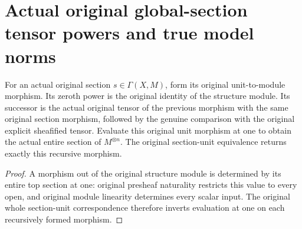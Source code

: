 \section{Actual original global-section tensor powers and true model norms}
\label{sec:scheme-global-section-tensor-power-norms}

\begin{definition}
\label{def:scheme-global-section-tensor-power}
\leanok
{}
For an actual original section $s\in\Gamma(X,M)$, form its original
unit-to-module morphism. Its zeroth power is the original identity of the
structure module. Its successor is the actual original tensor of the previous
morphism with the same original section morphism, followed by the genuine
comparison with the original explicit sheafified tensor. Evaluate this original
unit morphism at one to obtain the actual entire section of $M^{\otimes n}$.
The original section-unit equivalence returns exactly this recursive morphism.
\end{definition}
\begin{proof}
A morphism out of the original structure module is determined by its entire
top section at one: original presheaf naturality restricts this value to every
open, and original module linearity determines every scalar input. The
original whole section-unit correspondence therefore inverts evaluation at
one on each recursively formed morphism.
\end{proof}

